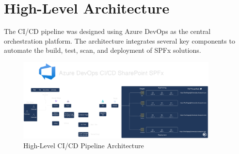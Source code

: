 \section{High-Level Architecture}
\label{sec:HighLevelArchitecture}

The CI/CD pipeline was designed using Azure DevOps as the central orchestration platform. The architecture integrates several key components to automate the build, test, scan, and deployment of SPFx solutions.

\begin{figure}[htbp]
    \centering
    \includegraphics[width=0.9\textwidth]{images/CI-CD.png} %
    \caption{High-Level CI/CD Pipeline Architecture}
    \label{fig:HighLevelArchitecture}
\end{figure}

